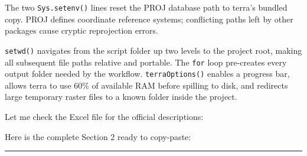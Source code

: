 \documentclass[
  10pt,
  b5paper,
  oneside]{book}
\newenvironment{Shaded}{\begin{snugshade}}{\end{snugshade}}
\newcommand{\AttributeTok}[1]{\textcolor[rgb]{0.13,0.29,0.53}{#1}}
\newcommand{\ConstantTok}[1]{\textcolor[rgb]{0.56,0.35,0.01}{#1}}
\newcommand{\ControlFlowTok}[1]{\textcolor[rgb]{0.13,0.29,0.53}{\textbf{#1}}}
\newcommand{\DecValTok}[1]{\textcolor[rgb]{0.00,0.00,0.81}{#1}}
\newcommand{\FloatTok}[1]{\textcolor[rgb]{0.00,0.00,0.81}{#1}}
\newcommand{\FunctionTok}[1]{\textcolor[rgb]{0.13,0.29,0.53}{\textbf{#1}}}
\newcommand{\NormalTok}[1]{#1}
\newcommand{\SpecialCharTok}[1]{\textcolor[rgb]{0.81,0.36,0.00}{\textbf{#1}}}
\newcommand{\StringTok}[1]{\textcolor[rgb]{0.31,0.60,0.02}{#1}}
\begin{document}
The two \texttt{Sys.setenv()} lines reset the PROJ database path to terra's bundled copy. PROJ defines coordinate reference systems; conflicting paths left by other packages cause cryptic reprojection errors.

\begin{Shaded}
\end{Shaded}

\texttt{setwd()} navigates from the script folder up two levels to the project root, making all subsequent file paths relative and portable. The \texttt{for} loop pre-creates every output folder needed by the workflow. \texttt{terraOptions()} enables a progress bar, allows terra to use 60\% of available RAM before spilling to disk, and redirects large temporary raster files to a known folder inside the project.

Let me check the Excel file for the official descriptions:

Here is the complete Section 2 ready to copy-paste:

\begin{center}\rule{0.5\linewidth}{0.5pt}\end{center}
\end{document}
